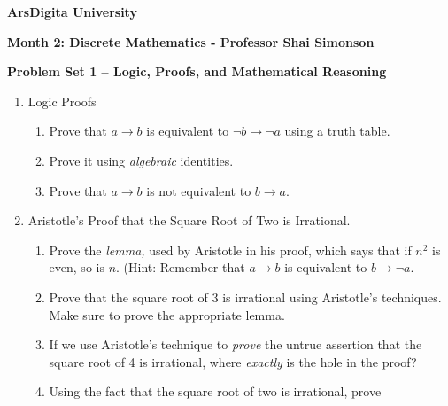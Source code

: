 \documentclass{article}
\begin{document}
\begin{center}
\textbf{ArsDigita University}


\end{center}

\begin{center}
\textbf{Month 2: Discrete Mathematics - Professor Shai Simonson}


\end{center}

\begin{center}
\textbf{Problem Set 1 -- Logic, Proofs, and Mathematical Reasoning}


\end{center}

\begin{enumerate}
\item { Logic Proofs }
    \begin{enumerate}
    \item   Prove that $a \rightarrow b$
            is equivalent to $\neg b
            \rightarrow \neg a$
            using a truth table. \\
    \item   Prove it using {\em algebraic} identities. \\
    \item   Prove that $a \rightarrow b$ is not
            equivalent to $ b \rightarrow a$.
    \end{enumerate}
\item {Aristotle's Proof that the Square Root of Two is Irrational.}\\
    \begin{enumerate}
    \item Prove the  {\em lemma,} used by Aristotle in his proof,
        which says that if $n^{2}$ is even, so is
        $n$. (Hint: Remember that $a \rightarrow  b$
        is equivalent to $b \rightarrow \neg a$.\\
    \item
        Prove that the square root of 3 is irrational using Aristotle's
        techniques. Make sure to prove the appropriate lemma.\\
    \item
        If we use Aristotle's technique to  {\em prove} the untrue assertion
        that the square root of 4 is irrational, where  {\em exactly} is
        the hole in the proof?\\
    \item Using the fact that the square root of two is irrational, prove

\end{enumerate}
\end{enumerate}
\end{document}
